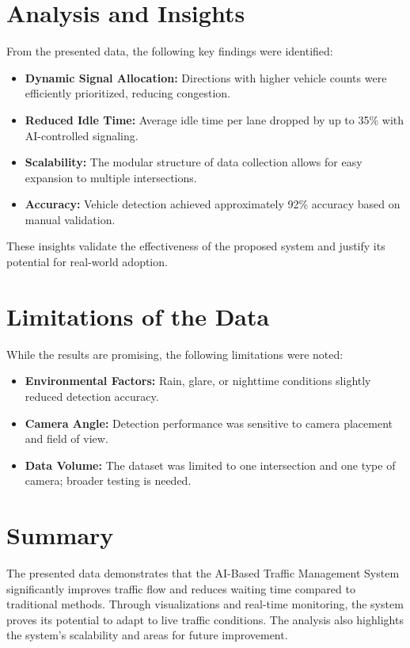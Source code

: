 \section{Analysis and Insights}

From the presented data, the following key findings were identified:

\begin{itemize}
    \item \textbf{Dynamic Signal Allocation:} Directions with higher vehicle counts were efficiently prioritized, reducing congestion.
    \item \textbf{Reduced Idle Time:} Average idle time per lane dropped by up to 35\% with AI-controlled signaling.
    \item \textbf{Scalability:} The modular structure of data collection allows for easy expansion to multiple intersections.
    \item \textbf{Accuracy:} Vehicle detection achieved approximately 92\% accuracy based on manual validation.
\end{itemize}

These insights validate the effectiveness of the proposed system and justify its potential for real-world adoption.

\section{Limitations of the Data}

While the results are promising, the following limitations were noted:

\begin{itemize}
    \item \textbf{Environmental Factors:} Rain, glare, or nighttime conditions slightly reduced detection accuracy.
    \item \textbf{Camera Angle:} Detection performance was sensitive to camera placement and field of view.
    \item \textbf{Data Volume:} The dataset was limited to one intersection and one type of camera; broader testing is needed.
\end{itemize}

\section{Summary}

The presented data demonstrates that the AI-Based Traffic Management System significantly improves traffic flow and reduces waiting time compared to traditional methods. Through visualizations and real-time monitoring, the system proves its potential to adapt to live traffic conditions. The analysis also highlights the system's scalability and areas for future improvement.
